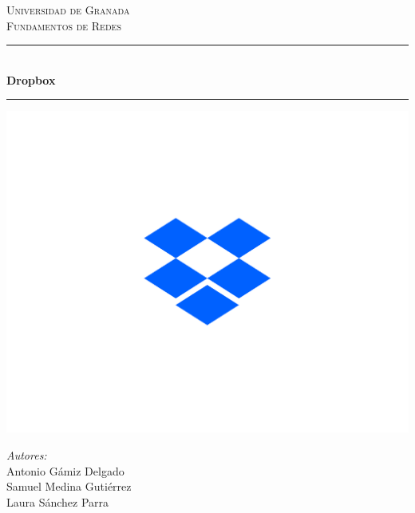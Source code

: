 \begin{titlepage}

\newcommand{\HRule}{\rule{\linewidth}{0.5mm}} %

\center %
 

\textsc{\LARGE Universidad de Granada}\\[1.5cm] %
\textsc{\large Fundamentos de Redes}\\[0.5cm] %


\HRule \\[0.4cm]
{ \huge \bfseries Dropbox}\\[0.4cm] %
\HRule

\includegraphics[scale=0.19]{logo.png}
 
\begin{flushleft} \large
\emph{Autores:}\\
Antonio Gámiz Delgado \\
Samuel Medina Gutiérrez \\
Laura Sánchez Parra
\end{flushleft}


\end{titlepage}
